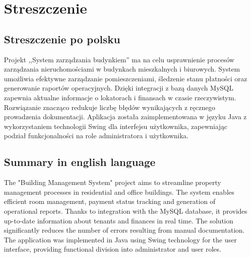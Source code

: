 \chapter{Streszczenie}

\section{Streszczenie po polsku}
Projekt ,,System zarządzania budynkiem'' ma na celu usprawnienie procesów zarządzania nieruchomościami w budynkach mieszkalnych i biurowych. System umożliwia efektywne zarządzanie pomieszczeniami, śledzenie stanu płatności oraz generowanie raportów operacyjnych. Dzięki integracji z bazą danych MySQL zapewnia aktualne informacje o lokatorach i finansach w czasie rzeczywistym. Rozwiązanie znacząco redukuje liczbę błędów wynikających z ręcznego prowadzenia dokumentacji. Aplikacja została zaimplementowana w języku Java z wykorzystaniem technologii Swing dla interfejsu użytkownika, zapewniając podział funkcjonalności na role administratora i użytkownika.

\section{Summary in english language}
The "Building Management System" project aims to streamline property management processes in residential and office buildings. The system enables efficient room management, payment status tracking and generation of operational reports. Thanks to integration with the MySQL database, it provides up-to-date information about tenants and finances in real time. The solution significantly reduces the number of errors resulting from manual documentation. The application was implemented in Java using Swing technology for the user interface, providing functional division into administrator and user roles.